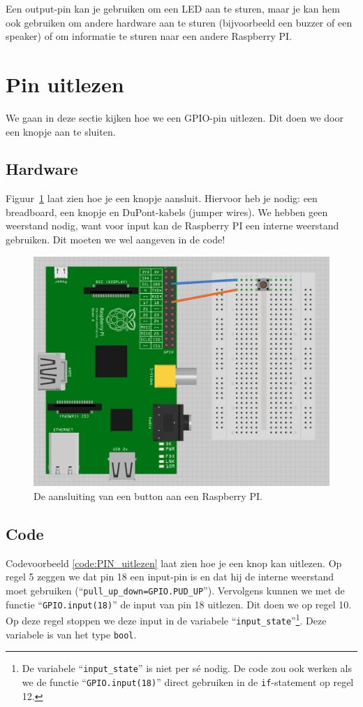 \documentclass{guide}
\begin{document}
Een output-pin kan je gebruiken om een LED aan te sturen, maar je kan hem ook gebruiken om andere hardware aan te sturen (bijvoorbeeld een buzzer of een speaker) of om informatie te sturen naar een andere Raspberry PI.

\section{Pin uitlezen}
\label{sec:pin_uitlezen}
We gaan in deze sectie kijken hoe we een GPIO-pin uitlezen. Dit doen we door een knopje aan te sluiten.

\subsection{Hardware}
Figuur~\ref{fig:PI_and_button} laat zien hoe je een knopje aansluit. Hiervoor heb je nodig: een breadboard, een knopje en DuPont-kabels (jumper wires). We hebben geen weerstand nodig, want voor input kan de Raspberry PI een interne weerstand gebruiken. Dit moeten we wel aangeven in de code!

\begin{figure}[ht]
\centering
\includegraphics[scale=0.6]{images/PI_and_button.png}
\caption{De aansluiting van een button aan een Raspberry PI.} \label{fig:PI_and_button}
\end{figure}

\subsection{Code}
Codevoorbeeld \ref{code:PIN_uitlezen} laat zien hoe je een knop kan uitlezen. Op regel 5 zeggen we dat pin 18 een input-pin is en dat hij de interne weerstand moet gebruiken (\enquote{\texttt{pull\_up\_down=GPIO.PUD\_UP}}). Vervolgens kunnen we met de functie \enquote{\texttt{GPIO.input(18)}} de input van pin 18 uitlezen. Dit doen we op regel 10. Op deze regel stoppen we deze input in de variabele \enquote{\texttt{input\_state}}\footnote{De variabele \enquote{\texttt{input\_state}} is niet per s\'{e} nodig. De code zou ook werken als we de functie \enquote{\texttt{GPIO.input(18)}} direct gebruiken in de \texttt{if}-statement op regel 12.}. Deze variabele is van het type \texttt{bool}.
\end{document}

